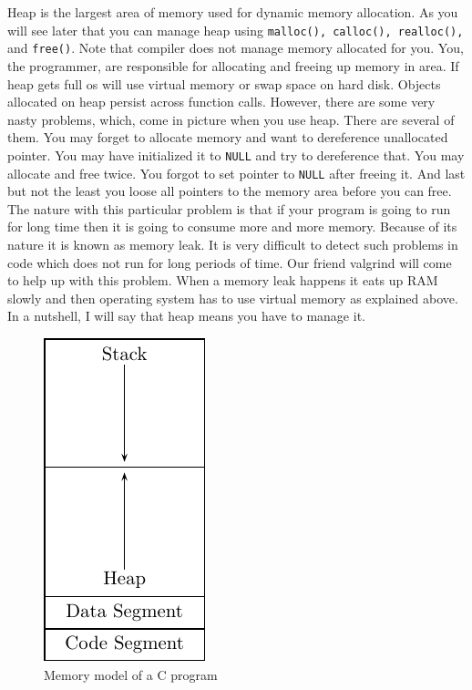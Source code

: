 Heap is the largest area of memory used for dynamic memory allocation. As
you will see later that you can manage heap using \texttt{malloc(), calloc(),
realloc(),} and \texttt{free()}. Note that compiler does not manage memory
allocated for you. You, the programmer, are responsible for allocating and
freeing up memory in area. If heap gets full os will use virtual memory or swap
space on hard disk. Objects allocated on heap persist across function
calls. However, there are some very nasty problems, which, come in picture when
you use heap. There are several of them. You may forget to allocate memory and
want to dereference unallocated pointer. You may have initialized it to
\texttt{NULL} and try to dereference that. You may allocate and free twice. You
forgot to set pointer to \texttt{NULL} after freeing it. And last but not the
least you loose all pointers to the memory area before you can free. The nature
with this particular problem is that if your program is going to run for long
time then it is going to consume more and more memory. Because of its nature it
is known as memory leak. It is very difficult to detect such problems in code
which does not run for long periods of time. Our friend valgrind will come to
help up with this problem. When a memory leak happens it eats up RAM slowly and
then operating system has to use virtual memory as explained above. In a
nutshell, I will say that heap means you have to manage it.

\begin{figure}[t!]
\begin{center}
\includegraphics{figs/mem_model.pdf}
\end{center}
\caption{Memory model of a C program}
\end{figure}

